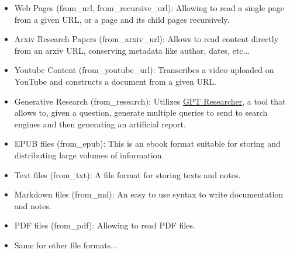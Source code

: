 \begin{itemize}
    \item Web Pages (from\_url, from\_recursive\_url): Allowing to read a single page from a given URL, or a page and its child pages recursively.
    \item Arxiv Research Papers (from\_arxiv\_url): Allows to read content directly from an arxiv URL, conserving metadata like author, dates, etc...
    \item Youtube Content (from\_youtube\_url): Transcribes a video uploaded on YouTube and constructs a document from a given URL.
    \item Generative Research (from\_research): Utilizes \href{https://gptr.dev/}{GPT Researcher}, a tool that allows to, given a question, generate multiple queries to send to search engines and then generating an artificial report.
    \item EPUB files (from\_epub): This is an e\-book format suitable for storing and distributing large volumes of information.
    \item Text files (from\_txt): A file format for storing texts and notes.
    \item Markdown files (from\_md): An easy to use syntax to write documentation and notes.
    \item PDF files (from\_pdf): Allowing to read PDF files.
    \item Same for other file formats...
\end{itemize}

